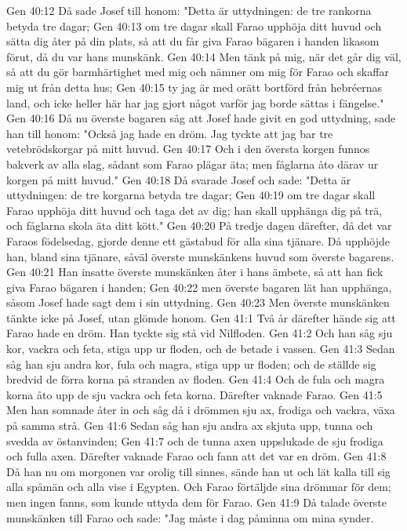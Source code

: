 Gen 40:12  Då sade Josef till honom: "Detta är uttydningen: de tre rankorna betyda tre dagar;
Gen 40:13  om tre dagar skall Farao upphöja ditt huvud och sätta dig åter på din plats, så att du får giva Farao bägaren i handen likasom förut, då du var hans munskänk.
Gen 40:14  Men tänk på mig, när det går dig väl, så att du gör barmhärtighet med mig och nämner om mig för Farao och skaffar mig ut från detta hus;
Gen 40:15  ty jag är med orätt bortförd från hebréernas land, och icke heller här har jag gjort något varför jag borde sättas i fängelse."
Gen 40:16  Då nu överste bagaren såg att Josef hade givit en god uttydning, sade han till honom: "Också jag hade en dröm. Jag tyckte att jag bar tre vetebrödskorgar på mitt huvud.
Gen 40:17  Och i den översta korgen funnos bakverk av alla slag, sådant som Farao plägar äta; men fåglarna åto därav ur korgen på mitt huvud."
Gen 40:18  Då svarade Josef och sade: "Detta är uttydningen: de tre korgarna betyda tre dagar;
Gen 40:19  om tre dagar skall Farao upphöja ditt huvud och taga det av dig; han skall upphänga dig på trä, och fåglarna skola äta ditt kött."
Gen 40:20  På tredje dagen därefter, då det var Faraos födelsedag, gjorde denne ett gästabud för alla sina tjänare. Då upphöjde han, bland sina tjänare, såväl överste munskänkens huvud som överste bagarens.
Gen 40:21  Han insatte överste munskänken åter i hans ämbete, så att han fick giva Farao bägaren i handen;
Gen 40:22  men överste bagaren lät han upphänga, såsom Josef hade sagt dem i sin uttydning.
Gen 40:23  Men överste munskänken tänkte icke på Josef, utan glömde honom.
Gen 41:1  Två år därefter hände sig att Farao hade en dröm. Han tyckte sig stå vid Nilfloden.
Gen 41:2  Och han såg sju kor, vackra och feta, stiga upp ur floden, och de betade i vassen.
Gen 41:3  Sedan såg han sju andra kor, fula och magra, stiga upp ur floden; och de ställde sig bredvid de förra korna på stranden av floden.
Gen 41:4  Och de fula och magra korna åto upp de sju vackra och feta korna. Därefter vaknade Farao.
Gen 41:5  Men han somnade åter in och såg då i drömmen sju ax, frodiga och vackra, växa på samma strå.
Gen 41:6  Sedan såg han sju andra ax skjuta upp, tunna och svedda av östanvinden;
Gen 41:7  och de tunna axen uppslukade de sju frodiga och fulla axen. Därefter vaknade Farao och fann att det var en dröm.
Gen 41:8  Då han nu om morgonen var orolig till sinnes, sände han ut och lät kalla till sig alla spåmän och alla vise i Egypten. Och Farao förtäljde sina drömmar för dem; men ingen fanns, som kunde uttyda dem för Farao.
Gen 41:9  Då talade överste munskänken till Farao och sade: "Jag måste i dag påminna om mina synder.
